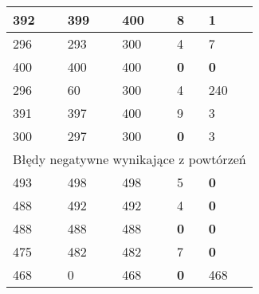 \documentclass[a4paper]{article}
\begin{document}
\begin{table}[H]
\begin{tabular}{|p{2cm}|p{2cm}|p{2cm}|p{2cm}|p{2cm}|}
392 & 399 & 400 & 8 & 1 \\ \hline
296 & 293 & 300 & 4 & 7 \\ \hline
400 & 400 & 400 & \textbf{0} & \textbf{0} \\ \hline
296 & 60 & 300 & 4 & 240 \\ \hline
391 & 397 & 400 & 9 & 3 \\ \hline
300 & 297 & 300 & \textbf{0} & 3 \\ \hline
\multicolumn{5}{|c|}{Błędy negatywne wynikające z powtórzeń} \\ \hline
493 & 498 & 498 & 5 & \textbf{0} \\ \hline
488 & 492 & 492 & 4 & \textbf{0} \\ \hline
488 & 488 & 488 & \textbf{0} & \textbf{0} \\ \hline
475 & 482 & 482 & 7 & \textbf{0} \\ \hline
468 & 0 & 468 & \textbf{0} & 468 \\ \hline
\end{tabular}
\label{}
\end{table}
\end{document}
